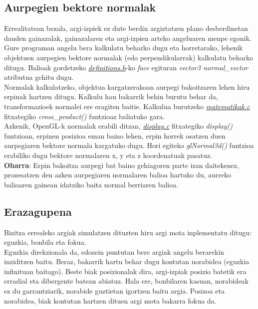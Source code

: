 \documentclass[12pt]{article}
\newcommand{\fitxategi}[1] {\underline{\textit{#1}}}
\newcommand{\metodo}[1] {\textit{#1}}
\newcommand{\aldagai}[1] {\textit{#1}}
\begin{document}
\subsection{Aurpegien bektore normalak}

Errealitatean bezala, argi-izpiek ez dute berdin argiztatzen plano desberdinetan dauden gainazalak, gainazalaren eta argi-izpien arteko angeluaren menpe egonik. Gure programan angelu bera kalkulatu beharko dugu eta horretarako, lehenik objektuen aurpegien bektore normalak (edo perpendikularrak) kalkulatu beharko ditugu. Balioak gordetzeko \fitxategi{definitions.h}-ko \aldagai{face} egituran \aldagai{vector3 normal\_vector} atributua gehitu dugu.\\

Normalak kalkulatzeko, objektua kargatzerakoan aurpegi bakoitzaren lehen hiru erpinak hartzen ditugu. Kalkulu hau bakarrik behin burutu behar da, transformazioek normalei ere eragiten baitie. Kalkulua burutzeko \fitxategi{matematikak.c} fitxategiko \metodo{cross\_product()} funtzioaz baliatuko gara.\\

Azkenik, OpenGL-k normalak erabili ditzan, \fitxategi{display.c} fitxategiko \metodo{display()} funtzioan, erpinen posizioa eman baino lehen, erpin horrek osatzen duen aurpegiaren bektore normala kargatuko dugu. Hori egiteko \metodo{glNormal3d()} funtzioa erabiliko dugu bektore normalaren x, y eta z koordenatuak pasatuz.\\

\textbf{Oharra}: Erpin bakoitza aurpegi bat baino gehiagoren parte izan daitekenez, prozesatzen den azken aurpegiaren normalaren balioa hartuko du, aurreko balioaren gainean idatziko baita normal berriaren balioa.
 
\subsection{Erazagupena}

Bizitza errealeko argiak simulatzen dituzten hiru argi mota inplementatu ditugu: eguzkia, bonbila eta fokua.\\

Eguzkia direkzionala da, edozein puntutan bere argiak angelu berarekin inziditzen baitu. Beraz, bakarrik hartu behar dugu kontutan norabidea (eguzkia infinituan baitago). Beste biak posizionalak dira, argi-izpiak posizio batetik era erradial eta dibergente batean abiatuz. Hala ere, bonbilaren kasuan, norabideak ez du garrantziarik, norabide guztietan igortzen baitu argia. Posizoa eta norabidea, biak kontutan hartzen dituen argi mota bakarra fokua da.
\end{document}
